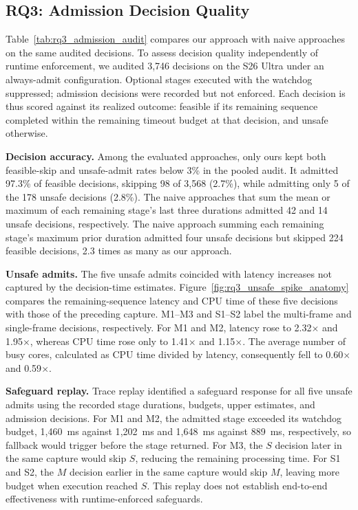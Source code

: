 \subsection{RQ3: Admission Decision Quality}
\label{sec:rq3}

Table~\ref{tab:rq3_admission_audit} compares our approach with naive approaches on the same audited decisions.
To assess decision quality independently of runtime enforcement, we audited 3{,}746 decisions on the S26 Ultra under an always-admit configuration.
Optional stages executed with the watchdog suppressed; admission decisions were recorded but not enforced.
Each decision is thus scored against its realized outcome: feasible if its remaining sequence completed within the remaining timeout budget at that decision, and unsafe otherwise.




\smallskip\noindent\textbf{Decision accuracy.}
Among the evaluated approaches, only ours kept both feasible-skip and unsafe-admit rates below 3\% in the pooled audit.
It admitted 97.3\% of feasible decisions, skipping 98 of 3{,}568 (2.7\%), while admitting only 5 of the 178 unsafe decisions (2.8\%).
The naive approaches that sum the mean or maximum of each remaining stage's last three durations admitted 42 and 14 unsafe decisions, respectively.
The naive approach summing each remaining stage's maximum prior duration admitted four unsafe decisions but skipped 224 feasible decisions, 2.3 times as many as our approach.

\smallskip\noindent\textbf{Unsafe admits.}
The five unsafe admits coincided with latency increases not captured by the decision-time estimates.
Figure~\ref{fig:rq3_unsafe_spike_anatomy} compares the remaining-sequence latency and CPU time of these five decisions with those of the preceding capture.
M1--M3 and S1--S2 label the multi-frame and single-frame decisions, respectively.
For M1 and M2, latency rose to 2.32\(\times\) and 1.95\(\times\), whereas CPU time rose only to 1.41\(\times\) and 1.15\(\times\).
The average number of busy cores, calculated as CPU time divided by latency, consequently fell to 0.60\(\times\) and 0.59\(\times\).

\smallskip\noindent\textbf{Safeguard replay.}
Trace replay identified a safeguard response for all five unsafe admits using the recorded stage durations, budgets, upper estimates, and admission decisions.
For M1 and M2, the admitted stage exceeded its watchdog budget, 1{,}460~ms against 1{,}202~ms and 1{,}648~ms against 889~ms, respectively, so fallback would trigger before the stage returned.
For M3, the \(S\) decision later in the same capture would skip \(S\), reducing the remaining processing time.
For S1 and S2, the \(M\) decision earlier in the same capture would skip \(M\), leaving more budget when execution reached \(S\).
This replay does not establish end-to-end effectiveness with runtime-enforced safeguards.

